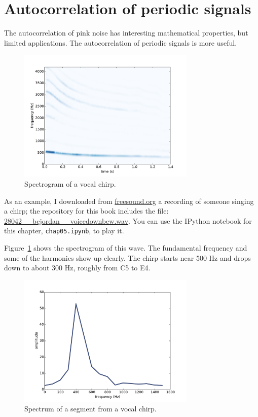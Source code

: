 \documentclass[12pt]{book}
\begin{document}
\section{Autocorrelation of periodic signals}

The autocorrelation of pink noise has interesting mathematical
properties, but limited applications.  The autocorrelation of
periodic signals is more useful.

\begin{figure}
\centerline{\includegraphics[height=2.5in]{figs/autocorr5.pdf}}
\caption{Spectrogram of a vocal chirp.}
\label{fig.autocorr5}
\end{figure}

As an example, I downloaded from \url{freesound.org} a recording of
someone singing a chirp; the repository for this book includes the
file: \url{28042__bcjordan__voicedownbew.wav}.  You can use the
IPython notebook for this chapter, {\tt chap05.ipynb}, to play it.

Figure~\ref{fig.autocorr5} shows the spectrogram of this wave.
The fundamental frequency and some of the harmonics show up clearly.
The chirp starts near 500 Hz and drops down to about 300 Hz, roughly
from C5 to E4.

\begin{figure}
\centerline{\includegraphics[height=2.5in]{figs/autocorr6.pdf}}
\caption{Spectrum of a segment from a vocal chirp.}
\label{fig.autocorr6}
\end{figure}
\end{document}

